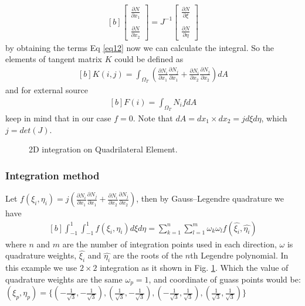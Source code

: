 \documentclass[]{article}
\begin{document}
\begin{equation}\label{eq16}
	\begin{aligned}[b]
\begin{bmatrix}
	\frac{\partial N}{\partial x_{1}}\\
	\\
	\frac{\partial N}{\partial x_{2}}  
\end{bmatrix}
= J^{-1}
\begin{bmatrix}
	\frac{\partial N}{\partial \xi}\\
	\\
	\frac{\partial N}{\partial \eta}
\end{bmatrix}
	\end{aligned}
\end{equation}
 by obtaining the terms Eq \ref{eq12} now we can calculate the integral. So the elements of tangent matrix $K$ could be defined as
\begin{equation}\label{eq17}
	\begin{aligned}[b]
		K(i,j) = \int_{\Omega_{T}} (\frac{\partial N_{i}}{\partial x_{1}}
		\frac{\partial N_{j}}{\partial x_{1}}+\frac{\partial N_{i}}{\partial x_{2}} 
		\frac{\partial N_{j}}{\partial x_{2}}) dA
	\end{aligned}
\end{equation}
and for external source 
\begin{equation}\label{eq18}
	\begin{aligned}[b]
		F(i) = \int_{\Omega_{T}} N_{i}f dA
	\end{aligned}
\end{equation}
keep in mind that in our case $f=0$. Note that $dA=dx_{1} \times dx_{2}=jd\xi d\eta$, which $j=det(J)$.
\begin{figure}[htbp]
	\centering
	
	\caption{2D integration on Quadrilateral Element.}
	\label{fig_int}
\end{figure} 
\subsubsection{Integration method} \label{sec: int}
Let $f(\xi_{i},\eta_{i})=j(\frac{\partial N_{i}}{\partial x_{1}}
\frac{\partial N_{j}}{\partial x_{1}}+\frac{\partial N_{i}}{\partial x_{2}} 
\frac{\partial N_{j}}{\partial x_{2}})$, then by Gauss–Legendre quadrature we have
\begin{equation}\label{eq19}
	\begin{aligned}[b]
		\int_{-1}^1 \int_{-1}^1 f(\xi_{i},\eta_{i}) d\xi d\eta = \sum_{k=1}^{n}\sum_{l=1}^{m} \omega_{k}\omega_{l}f(\hat{\xi_{i}},\hat{\eta_{i}})
	\end{aligned}
\end{equation}
where $n$ and $m$ are the number of integration points used in each direction, $\omega$ is quadrature weights, $\hat{\xi_{i}}$ and $\hat{\eta_{i}}$ are the roots of the $n$th Legendre polynomial. In this example we use $2 \times 2$ integration as it shown in Fig. \ref{fig_int}. Which the value of  quadrature weights are the same $\omega_{p}=1$, and coordinate of guass points would be:  $(\xi_{p}, \eta_{p})=\{(-\frac{1}{\sqrt{3}},-\frac{1}{\sqrt{3}}),  (\frac{1}{\sqrt{3}}, -\frac{1}{\sqrt{3}}),  (-\frac{1}{\sqrt{3}}, \frac{1}{\sqrt{3}}), (\frac{1}{\sqrt{3}}, \frac{1}{\sqrt{3}})\}$
\end{document}
